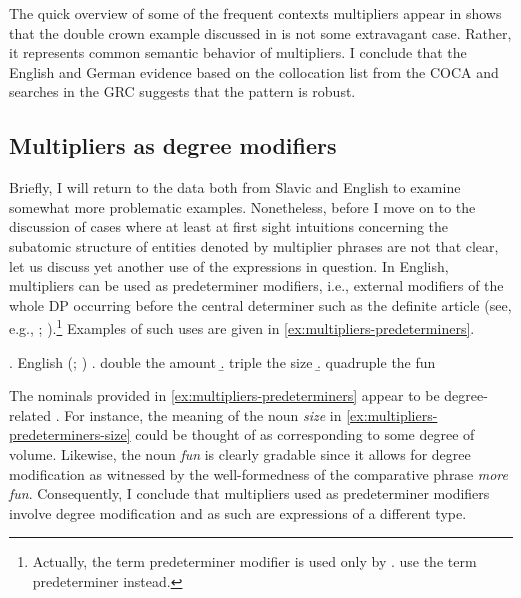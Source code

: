 The quick overview of some of the frequent contexts multipliers appear in shows that the double crown example discussed in  is not some extravagant case. Rather, it represents common semantic behavior of multipliers. I conclude that the English and German evidence based on the collocation list from the COCA and searches in the GRC suggests that the pattern is robust. 

\subsection{Multipliers as degree modifiers}\label{sec:multipliers-as-degree-modifiers}

Briefly, I will return to the data both from Slavic and English to examine somewhat more problematic examples. Nonetheless, before I move on to the discussion of cases where at least at first sight intuitions concerning the subatomic structure of entities denoted by multiplier phrases are not that clear, let us discuss yet another use of the expressions in question. In English, multipliers can be used as predeterminer modifiers, i.e., external modifiers of the whole DP occurring before the central determiner such as the definite article (see, e.g., \citealt[pp. 257--258]{quirk_greenbaum_leech_svartvik1985comprehensive}; \citealt[pp. 433--436]{huddleston_pullum2002cambridge}).\footnote{Actually, the term predeterminer modifier is used only by \citeauthor{huddleston_pullum2002cambridge}. \citeauthor{quirk_greenbaum_leech_svartvik1985comprehensive} use the term predeterminer instead.} Examples of such uses are given in \ref{ex:multipliers-predeterminers}. 

\ex. English (\citealt[p. 257]{quirk_greenbaum_leech_svartvik1985comprehensive}; \citealt[p. 434; adapted]{huddleston_pullum2002cambridge})\label{ex:multipliers-predeterminers}
\a. double the amount\label{ex:multipliers-predeterminers-sum}
\b. triple the size\label{ex:multipliers-predeterminers-size}
\b. quadruple the fun\label{ex:multipliers-predeterminers-fun}

The nominals provided in \ref{ex:multipliers-predeterminers} appear to be degree-related \citep[see][]{morzycki2009degree}. For instance, the meaning of the noun \textit{size} in \ref{ex:multipliers-predeterminers-size} could be thought of as corresponding to some degree of volume. Likewise, the noun \textit{fun} is clearly gradable since it allows for degree modification as witnessed by the well-formedness of the comparative phrase \textit{more fun}. Consequently, I conclude that multipliers used as predeterminer modifiers involve degree modification and as such are expressions of a different type.

